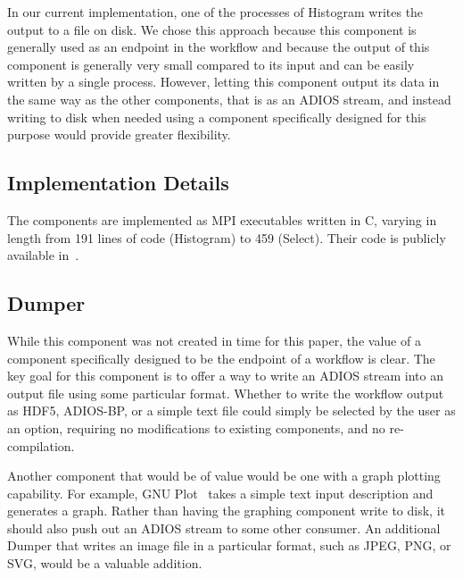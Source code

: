 In our current implementation, one of the processes
of Histogram writes the
output to a file on disk. We chose this approach
because this component is generally used as an
endpoint in the workflow and because the output of this
component is generally very small compared to its input
and can be easily written by a single process.
However, letting this component output
its data in the same way as the other components,
that is as an ADIOS stream, and instead writing to
disk when needed using a component specifically
designed for this purpose would
provide greater flexibility.

\subsection{Implementation Details}
The components are implemented as MPI executables
written in C, varying in length from
191 lines of code (Histogram) to
459 (Select).
Their code is publicly available
in~\cite{champsaur:superglue-repo}.


\subsection{Dumper}

While this component was not created in time for this paper, the value of
a component specifically designed to be the endpoint of a workflow
is clear. The key goal for this component is to offer a way to write an ADIOS stream into an
output file using some particular format. Whether to write the workflow output as
HDF5, ADIOS-BP, or a simple text file could simply be selected by the user as an option,
requiring no modifications to existing components, and no re-compilation.

Another component that would be of value would be one with a graph plotting capability.
For example, GNU
Plot~\cite{racine:2006:gnuplot} takes a simple text input description and
generates a graph.  Rather than having the graphing component write to
disk, it should also push out an ADIOS stream to some other consumer. An
additional Dumper that writes an image file in a particular format, such as
JPEG, PNG, or SVG, would be a valuable addition.
\fi
